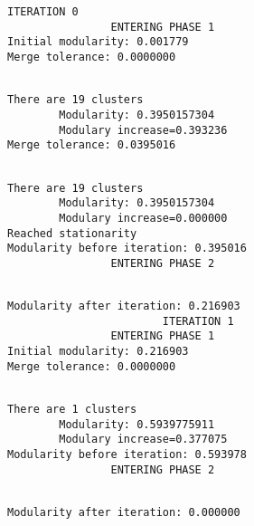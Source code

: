 \documentclass[11pt]{article}
\begin{document}
    \begin{Verbatim}[commandchars=\\\{\},fontsize=\footnotesize]
                        ITERATION 0
                ENTERING PHASE 1
Initial modularity: 0.001779
Merge tolerance: 0.0000000

    \end{Verbatim}

    
    
    \begin{Verbatim}[commandchars=\\\{\},fontsize=\footnotesize]

There are 19 clusters
        Modularity: 0.3950157304
        Modulary increase=0.393236
Merge tolerance: 0.0395016

    \end{Verbatim}

    
    
    \begin{Verbatim}[commandchars=\\\{\},fontsize=\footnotesize]

There are 19 clusters
        Modularity: 0.3950157304
        Modulary increase=0.000000
Reached stationarity
Modularity before iteration: 0.395016
                ENTERING PHASE 2

    \end{Verbatim}

    
    
    \begin{Verbatim}[commandchars=\\\{\},fontsize=\footnotesize]

Modularity after iteration: 0.216903
                        ITERATION 1
                ENTERING PHASE 1
Initial modularity: 0.216903
Merge tolerance: 0.0000000

    \end{Verbatim}

    
    
    \begin{Verbatim}[commandchars=\\\{\},fontsize=\footnotesize]

There are 1 clusters
        Modularity: 0.5939775911
        Modulary increase=0.377075
Modularity before iteration: 0.593978
                ENTERING PHASE 2

    \end{Verbatim}

    
    
    \begin{Verbatim}[commandchars=\\\{\},fontsize=\footnotesize]

Modularity after iteration: 0.000000

    \end{Verbatim}
\end{document}
